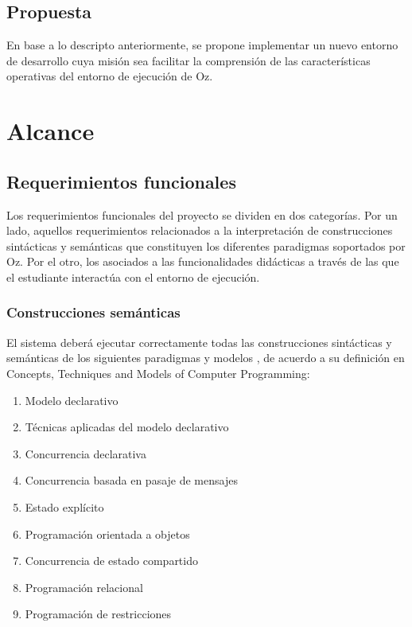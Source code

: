 \documentclass[a4paper,11pt]{article}
\begin{document}
\subsection{Propuesta}

En base a lo descripto anteriormente, se propone implementar un nuevo entorno
de desarrollo cuya misión sea facilitar la comprensión de las características
operativas del entorno de ejecución de Oz.

\section{Alcance}

\subsection{Requerimientos funcionales}

Los requerimientos funcionales del proyecto se dividen en dos categorías. Por
un lado, aquellos requerimientos relacionados a la interpretación de
construcciones sintácticas y semánticas que constituyen los diferentes
paradigmas soportados por Oz. Por el otro, los asociados a las funcionalidades
didácticas a través de las que el estudiante interactúa con el entorno de
ejecución.

\subsubsection{Construcciones semánticas}

El sistema deberá ejecutar correctamente todas las construcciones sintácticas y
semánticas de los siguientes paradigmas y modelos , de acuerdo a su definición
en Concepts, Techniques and Models of Computer Programming:

\begin{enumerate}

  \item Modelo declarativo

  \item Técnicas aplicadas del modelo declarativo

  \item Concurrencia declarativa

  \item Concurrencia basada en pasaje de mensajes

  \item Estado explícito

  \item Programación orientada a objetos

  \item Concurrencia de estado compartido

  \item Programación relacional

  \item Programación de restricciones

\end{enumerate}
\end{document}
